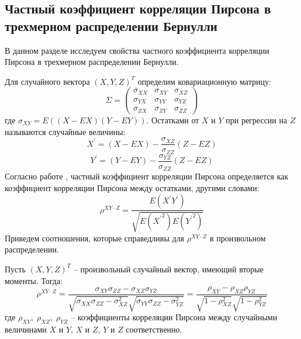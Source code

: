 \subsection{Частный коэффициент корреляции Пирсона в трехмерном распределении Бернулли}\label{partial_section}

В данном разделе исследуем свойства частного коэффициента корреляции Пирсона
в трехмерном распределении Бернулли.

Для случайного вектора $(X,Y,Z)^T$ определим ковариационную матрицу:
$$\Sigma =
    \begin{pmatrix}
        \sigma_{XX} & \sigma_{XY} & \sigma_{XZ} \\
        \sigma_{YX} & \sigma_{YY} & \sigma_{YZ} \\
        \sigma_{ZX} & \sigma_{ZY} & \sigma_{ZZ}
    \end{pmatrix}
$$
где $\sigma_{XY}=E((X-EX)(Y-EY))$.
Остатками от $X$ и $Y$ при регрессии на $Z$ называются случайные величины:
$$
X^{\prime}=(X-EX)-\dfrac{\sigma_{XZ}}{\sigma_{ZZ}}(Z-EZ)
$$
$$
Y^{\prime}=(Y-EY)-\dfrac{\sigma_{YZ}}{\sigma_{ZZ}}(Z-EZ)
$$
Согласно работе \cite{Cramér1946}, частный коэффициент корреляции Пирсона определяется как коэффициент
корреляции Пирсона между остатками, другими словами:
$$
\rho^{XY \cdot Z}=\dfrac{E(X^{\prime} Y^{\prime})}{\sqrt{E({X^{\prime}}^2) E({Y^{\prime}}^2)}}
$$
Приведем соотношения, которые справедливы
для $\rho^{XY \cdot Z}$ в произвольном распределении.
\begin{lemma}
    Пусть $(X,Y,Z)^T$ -- произвольный случайный вектор,
    имеющий вторые моменты. Тогда:
    $$
    \rho^{XY \cdot Z}=\dfrac{\sigma_{XY} \sigma_{ZZ} - \sigma_{XZ} \sigma_{YZ}}{\sqrt{\sigma_{XX}\sigma_{ZZ}-
        \sigma_{XZ}^2}\sqrt{\sigma_{YY}\sigma_{ZZ}-\sigma_{YZ}^2}}=\dfrac{\rho_{XY}-\rho_{XZ}\rho_{YZ}}{\sqrt{1-\rho_{XZ}^2}\sqrt{1-\rho_{YZ}^2}}
    $$
    где $\rho_{XY}, \; \rho_{XZ}, \; \rho_{YZ}$ -- коэффициенты корреляции Пирсона
        между случайными величинами $X$ и $Y$, $X$ и $Z$, $Y$ и $Z$
        соответственно.
\end{lemma}
